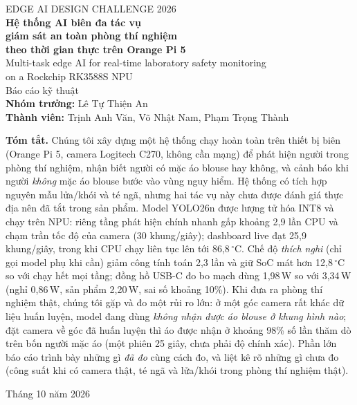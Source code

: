 \documentclass[12pt,a4paper]{article}
\begin{document}
\begin{titlepage}
\centering
\vspace*{2.2cm}
{\large EDGE AI DESIGN CHALLENGE 2026}\\[1.2cm]
{\LARGE\bfseries Hệ thống AI biên đa tác vụ\\giám sát an toàn phòng thí nghiệm\\theo thời gian thực trên Orange Pi 5}\\[0.9cm]
{\large Multi-task edge AI for real-time laboratory safety monitoring\\on a Rockchip RK3588S NPU}\\[2.6cm]
{\large Báo cáo kỹ thuật}\\[0.6cm]
{\large \textbf{Nhóm trưởng:} Lê Tự Thiện An}\\[0.2cm]
{\large \textbf{Thành viên:} Trịnh Anh Văn, Võ Nhật Nam, Phạm Trọng Thành}\\[2.8cm]
\begin{minipage}{0.82\textwidth}
\small\textbf{Tóm tắt.}
Chúng tôi xây dựng một hệ thống chạy hoàn toàn trên thiết bị biên (Orange Pi 5, camera Logitech C270, không cần
mạng) để phát hiện người trong phòng thí nghiệm, nhận biết người có mặc áo blouse hay không, và cảnh báo khi người
\emph{không} mặc áo blouse bước vào vùng nguy hiểm. Hệ thống có tích hợp nguyên mẫu lửa/khói và té ngã, nhưng hai
tác vụ này chưa được đánh giá thực địa nên đã tắt trong sản phẩm. Model YOLO26n được lượng tử hóa INT8 và chạy trên NPU: riêng tầng phát hiện
chính nhanh gấp khoảng 2,9 lần CPU và chạm trần tốc độ của camera (30 khung/giây); dashboard live đạt 25,9 khung/giây,
trong khi CPU chạy liên tục lên tới 86,8\,$^\circ$C. Chế độ \emph{thích nghi} (chỉ gọi model phụ khi cần) giảm công
tính toán 2,3 lần và giữ SoC mát hơn 12,8\,$^\circ$C so với chạy hết mọi tầng; đồng hồ USB-C đo bo mạch dùng 1,98\,W so với 3,34\,W (nghỉ 0,86\,W, sản phẩm 2,20\,W, sai số khoảng 10\%). Khi đưa ra phòng thí nghiệm thật, chúng tôi gặp và đo một rủi ro lớn: ở một góc camera rất khác dữ liệu huấn luyện, model đang dùng
\emph{không nhận được áo blouse ở khung hình nào}; đặt camera về góc đã huấn luyện thì áo được nhận ở khoảng 98\% số lần thăm dò
trên bốn người mặc áo (một phiên 25 giây, chưa phải độ chính xác). Phần lớn báo cáo trình bày những gì
\emph{đã đo} cùng cách đo, và liệt kê rõ những gì chưa đo (công suất khi có camera thật, té ngã và lửa/khói trong
phòng thí nghiệm thật).
\end{minipage}
\vfill
{\small Tháng 10 năm 2026}
\end{titlepage}
\end{document}
